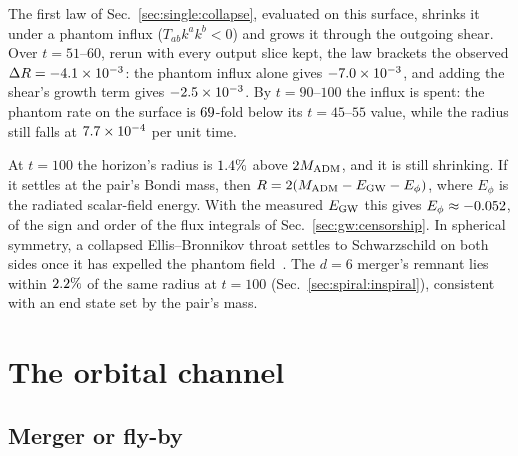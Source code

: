 \documentclass[twocolumn,floatfix,aps,prd,superscriptaddress,nofootinbib,showkeys]{revtex4-2}
\begin{document}
The first law of Sec.~\ref{sec:single:collapse}, evaluated on this surface, shrinks it under a phantom influx ($T_{ab}k^ak^b<0$) and grows it through the outgoing shear. Over $t=51$--$60$, rerun with every output slice kept, the law brackets the observed $\Delta R=-4.1\times10^{-3}$: the phantom influx alone gives $-7.0\times10^{-3}$, and adding the shear's growth term gives $-2.5\times10^{-3}$. By $t=90$--$100$ the influx is spent: the phantom rate on the surface is $69$-fold below its $t=45$--$55$ value, while the radius still falls at $7.7\times10^{-4}$ per unit time.

At $t=100$ the horizon's radius is $1.4\%$ above $2M_{\rm ADM}$, and it is still shrinking. If it settles at the pair's Bondi mass, then $R=2(M_{\rm ADM}-E_{\rm GW}-E_\phi)$, where $E_\phi$ is the radiated scalar-field energy. With the measured $E_{\rm GW}$ this gives $E_\phi\approx-0.052$, of the sign and order of the flux integrals of Sec.~\ref{sec:gw:censorship}. In spherical symmetry, a collapsed Ellis--Bronnikov throat settles to Schwarzschild on both sides once it has expelled the phantom field~\cite{kain2026}. The $d=6$ merger's remnant lies within $2.2\%$ of the same radius at $t=100$ (Sec.~\ref{sec:spiral:inspiral}), consistent with an end state set by the pair's mass.

\section{The orbital channel}
\label{sec:spiral}

\subsection{Merger or fly-by}
\label{sec:spiral:capture}
\end{document}
